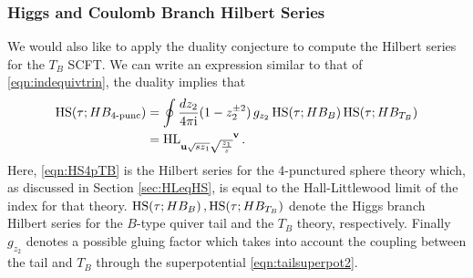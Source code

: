 \documentclass[main.tex]{subfiles}
\begin{document}
\subsubsection{Higgs and Coulomb Branch Hilbert Series}\label{sec:HBHSTB}
We would also like to apply the duality conjecture to compute the Hilbert series for the $T_B$ SCFT. We can write an expression similar to that of \eqref{eqn:indequivtrin}, the duality implies that
\begin{equation}
\begin{aligned}
\HS(\tau;HB_{\text{4-punc}})&=\oint \frac{dz_2}{4\pi\iu}(1-z_2^{\pm2})\,g_{z_2}\,\HS(\tau;HB_B)\,\HS(\tau;HB_{T_B})\label{eqn:HS4pTB}\\
&=\HL\indices{_{{\mathbf{u}}{\sqrt{sz_1}}{\sqrt{\frac{z_1}{s}}}}^{\mathbf{v}}}\,.
\end{aligned}
\end{equation}
Here, \eqref{eqn:HS4pTB} is the Hilbert series for the 4-punctured sphere theory which, as discussed in Section \ref{sec:HLeqHS}, is equal to the Hall-Littlewood limit of the index for that theory. $\textrm{HS}(\tau;HB_B)\,,\textrm{HS}(\tau;HB_{T_B})$ denote the Higgs branch Hilbert series for the $B$-type quiver tail and the $T_B$ theory, respectively. Finally $g_{z_2}$ denotes a possible gluing factor which takes into account the coupling between the tail and $T_B$ through the superpotential \eqref{eqn:tailsuperpot2}.
\end{document}
